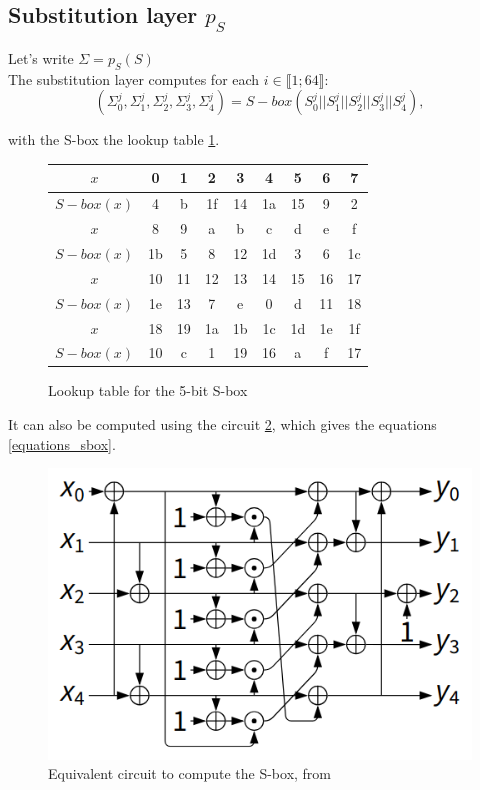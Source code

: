 \documentclass[a4paper,11pt,twocolumn]{article}
\begin{document}
		\subsection{Substitution layer $p_S$}
		Let's write $\Sigma=p_S(S)$\\
		The substitution layer computes for each $i \in \llbracket 1;64 \rrbracket$:
			$$(\Sigma_0^j,\Sigma_1^j,\Sigma_2^j,\Sigma_3^j,\Sigma_4^j) = S-box(S_0^j||S_1^j||S_2^j||S_3^j||S_4^j),$$
			
		with the S-box the lookup table \ref{lookup_sbox}.
		
		\begin{figure}[h]
			\small
			\centering
			\begin{tabular}{|c||*{8}{c|}}
				\hline
				$x$&0&1&2&3&4&5&6&7\\
				\hline
				$S-box(x)$&4&b&1f&14&1a&15&9&2\\
				\hline\hline
				$x$&8&9&a&b&c&d&e&f\\
				\hline
				$S-box(x)$&1b&5&8&12&1d&3&6&1c\\
				\hline\hline
				$x$&10&11&12&13&14&15&16&17\\
				\hline
				$S-box(x)$&1e&13&7&e&0&d&11&18\\
				\hline\hline
				$x$&18&19&1a&1b&1c&1d&1e&1f\\
				\hline
				$S-box(x)$&10&c&1&19&16&a&f&17\\
				\hline
			\end{tabular}
			\caption{Lookup table for the 5-bit S-box}
			\label{lookup_sbox}
		\end{figure}
		
		It can also be computed using the circuit \ref{circuit_sbox}, which gives the equations \ref{equations_sbox}.
		
		\begin{figure}[H]
			\centering
			\includegraphics[scale=0.4]{circuit}
			\caption{Equivalent circuit to compute the S-box, from \cite{norme}}
			\label{circuit_sbox}
		\end{figure}
		
\end{document}
